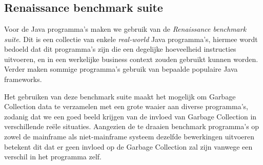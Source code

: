 
\chapter{}%
\label{ch:methodologie}








\section{Renaissance benchmark suite}
Voor de Java programma's maken we gebruik van de \textit{Renaissance benchmark suite}.
Dit is een collectie van enkele \textit{real-world} Java programma's, hiermee wordt bedoeld dat dit programma's zijn die een degelijke hoeveelheid instructies uitvoeren, en in een werkelijke business context zouden gebruikt kunnen worden. 
Verder maken sommige programma's gebruik van bepaalde populaire Java frameworks.



Het gebruiken van deze benchmark suite maakt het mogelijk om Garbage Collection data te verzamelen met een grote waaier aan diverse programma's, zodanig dat we een goed beeld krijgen van de invloed van Garbage Collection in verschillende reële situaties.
Aangezien de te draaien benchmark programma's op zowel de mainframe als niet-mainframe systeem dezelfde bewerkingen uitvoeren betekent dit dat er geen invloed op de Garbage Collection zal zijn vanwege een verschil in het programma zelf.



